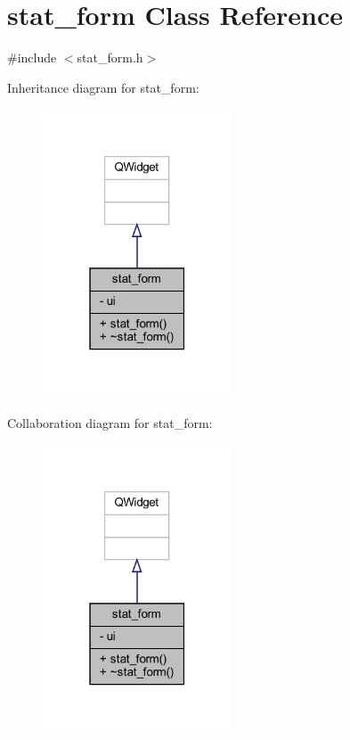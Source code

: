 \hypertarget{classstat__form}{}\section{stat\+\_\+form Class Reference}
\label{classstat__form}


{\ttfamily \#include $<$stat\+\_\+form.\+h$>$}



Inheritance diagram for stat\+\_\+form\+:
\nopagebreak
\begin{figure}[H]
\begin{center}
\leavevmode
\includegraphics[width=159pt]{classstat__form__inherit__graph}
\end{center}
\end{figure}


Collaboration diagram for stat\+\_\+form\+:
\nopagebreak
\begin{figure}[H]
\begin{center}
\leavevmode
\includegraphics[width=159pt]{classstat__form__coll__graph}
\end{center}
\end{figure}
